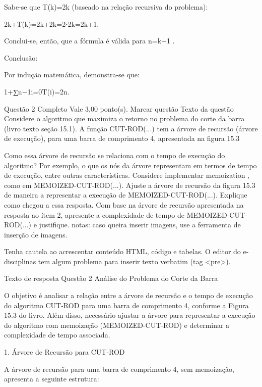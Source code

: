Sabe-se que T(k)=2k
 (baseado na relação recursiva do problema):

2k+T(k)=2k+2k=2⋅2k=2k+1.



Conclui-se, então, que a fórmula é válida para n=k+1
.



Conclusão:

Por indução matemática, demonstra-se que:

1+∑n−1i=0T(i)=2n.

Questão 2
Completo
Vale 3,00 ponto(s).
Marcar questão
Texto da questão
Considere o algoritmo que maximiza o retorno no problema do corte da barra (livro texto seção 15.1). A função CUT-ROD(...) tem a árvore de recursão (árvore de execução), para uma barra de comprimento 4, apresentada na figura 15.3

Como essa árvore de recursão se relaciona com o tempo de execução do algoritmo? Por exemplo, o que os nós da árvore representam em termos de tempo de execução, entre outras características.
Considere implementar memoization , como em MEMOIZED-CUT-ROD(...). Ajuste a árvore de recursão da figura 15.3 de maneira a representar a execução de MEMOIZED-CUT-ROD(...). Explique como chegou a essa resposta.
Com base na árvore de recursão apresentada na resposta ao ítem 2, apresente a complexidade de tempo de MEMOIZED-CUT-ROD(...) e justifique.
notas: caso queira inserir imagens, use a ferramenta de inserção de imagens.

          Tenha cautela ao acrescentar conteúdo HTML, código e tabelas. O editor do e-disciplinas tem algum problema para inserir texto verbatim (tag <pre>).





Texto de resposta Questão 2
Análise do Problema do Corte da Barra



O objetivo é analisar a relação entre a árvore de recursão e o tempo de execução do algoritmo CUT-ROD para uma barra de comprimento 4, conforme a Figura 15.3 do livro. Além disso, necessário ajustar a árvore para representar a execução do algoritmo com memoização (MEMOIZED-CUT-ROD) e determinar a complexidade de tempo associada.



1. Árvore de Recursão para CUT-ROD



A árvore de recursão para uma barra de comprimento 4, sem memoização, apresenta a seguinte estrutura:

